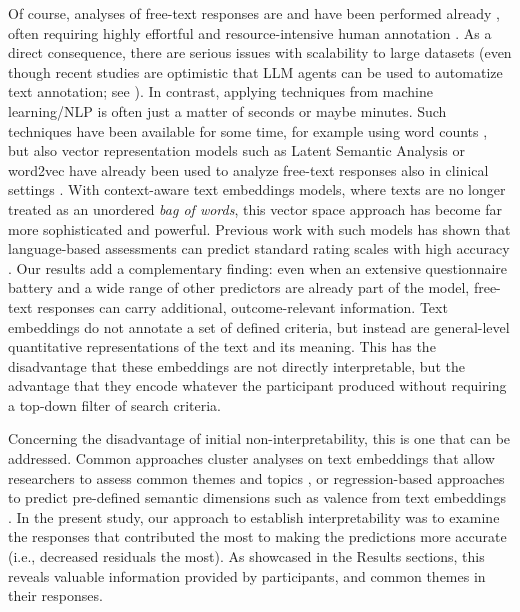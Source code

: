 \documentclass[man,floatsintext]{apa7}
\newcommand{\change}[1]{#1}
\begin{document}
Of course, analyses of free-text responses are and have been performed already \parencite{mayring2014qualitative}, often requiring highly effortful and resource-intensive human annotation \cite{braun2006using,oconnor2020intercoder}. As a direct consequence, there are serious issues with scalability to large datasets (even though recent studies are optimistic that LLM agents can be used to automatize text annotation; see \cite{ziems2024can,gilardi2023chatgpt}). In contrast, applying techniques from machine learning/NLP is often just a matter of seconds or maybe minutes. Such techniques have been available for some time, for example using word counts \parencite{tausczik2010psychological}, but also vector representation models such as Latent Semantic Analysis or word2vec have already been used to analyze free-text responses also in clinical settings \parencite{barattieri2023automated,de2018clinical,kintsch2002potential,elvevaag2007quantifying}. With context-aware text embeddings models, where texts are no longer treated as an unordered \emph{bag of words}, this vector space approach has become far more sophisticated and powerful. \change{Previous work with such models has shown that language-based assessments can predict standard rating scales with high accuracy \parencite{Kjell2019,kjell2022natural}. Our results add a complementary finding: even when an extensive questionnaire battery and a wide range of other predictors are already part of the model, free-text responses can carry additional, outcome-relevant information.} Text embeddings do not annotate a set of defined criteria, but instead are general-level quantitative representations of the text and its meaning. This has the disadvantage that these embeddings are not directly interpretable, but the advantage that they encode whatever the participant produced without requiring a top-down filter of search criteria. 

Concerning the disadvantage of initial non-interpretability, this is one that can be addressed. Common approaches cluster analyses on text embeddings that allow researchers to assess common themes and topics \parencite{grootendorst2022bertopic,lalk2024measuring}, or regression-based approaches to predict pre-defined semantic dimensions such as valence from text embeddings \parencite{gatti2024valence}. In the present study, our approach to establish interpretability was to examine the responses that contributed the most to making the predictions more accurate (i.e., decreased residuals the most). As showcased in the Results sections, this reveals valuable information provided by participants, and common themes in their responses.
\end{document}
